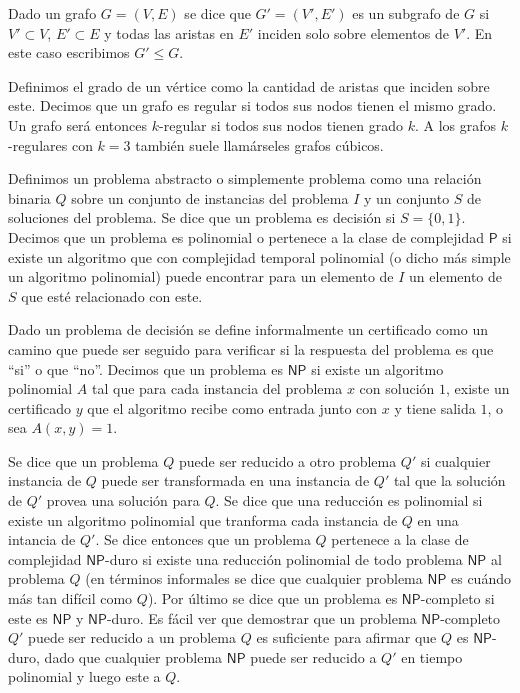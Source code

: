 \documentclass[10pt]{amsart}
\theoremstyle{definition}
\numberwithin{equation}{section}
\newcommand{\edge}[1]{\langle #1\rangle}
\begin{document}

Dado un grafo $G = (V,E)$ se dice que $G' = (V', E')$ es un subgrafo  de $G$ si $V' \subset V$, $E' \subset E$ y todas las aristas en $E'$ inciden solo sobre elementos de $V'$.  En este caso escribimos $G' \le G$.

Definimos el grado de un v\'ertice como la cantidad de aristas que inciden sobre este. Decimos que un grafo es regular si todos sus nodos tienen el mismo grado. Un grafo ser\'a entonces $k$-regular si todos sus nodos tienen grado $k$. A los grafos $k$-regulares con $k = 3$ tambi\'en suele llam\'arseles grafos c\'ubicos.


Definimos un problema abstracto o simplemente problema como una relaci\'on binaria $Q$ sobre un conjunto de instancias del problema $I$ y un conjunto $S$ de soluciones del problema. Se dice que un problema es decisi\'on si $S = \{0, 1\}$.  Decimos que un problema es polinomial o pertenece a la clase de complejidad $\mathsf{P}$ si existe un algoritmo que con complejidad temporal polinomial (o dicho m\'as simple un algoritmo polinomial) puede encontrar para un elemento de $I$ un elemento de $S$ que est\'e relacionado con este. 

Dado un problema de decisi\'on se define informalmente un certificado  como un camino que puede ser seguido para verificar si la respuesta del problema es que ``si'' o que ``no''. Decimos que un problema es $\mathsf{NP}$ si existe un algoritmo polinomial $A$ tal que para cada instancia del problema $x$ con soluci\'on $1$, existe un certificado $y$ que el algoritmo recibe como entrada junto con $x$ y tiene salida $1$, o sea $A(x,y) = 1$.

Se dice que un problema $Q$ puede ser reducido a otro problema $Q'$ si cualquier instancia de $Q$ puede ser transformada en una instancia de $Q'$ tal que la soluci\'on de $Q'$ provea una soluci\'on para $Q$. Se dice que una reducci\'on  es polinomial si existe un algoritmo polinomial que tranforma cada instancia de $Q$ en una intancia de $Q'$. Se dice entonces que un problema $Q$ pertenece a la clase de complejidad $\mathsf{NP}$-duro si existe una reducci\'on polinomial de todo problema $\mathsf{NP}$ al problema $Q$ (en t\'erminos informales se dice que cualquier problema $\mathsf{NP}$ es cu\'ando m\'as tan dif\'icil como $Q$). Por \'ultimo se dice que un problema es $\mathsf{NP}$-completo si este es $\mathsf{NP}$ y $\mathsf{NP}$-duro. Es f\'acil ver que demostrar que un problema $\mathsf{NP}$-completo $Q'$ puede ser reducido a un problema  $Q$ es  suficiente para afirmar que $Q$ es $\mathsf{NP}$-duro, dado que cualquier problema $\mathsf{NP}$ puede ser reducido a $Q'$ en tiempo polinomial y luego este a $Q$.
\end{document}
